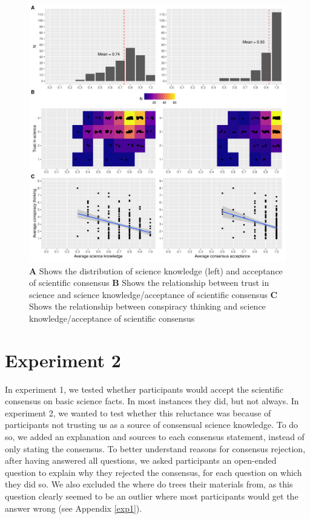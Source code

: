 \documentclass[
  doc,floatsintext]{apa6}
\begin{document}
\begin{figure}
\centering
\includegraphics{output/figures/exp1-plot-overview.pdf}
\caption{\label{fig:exp1-plot-overview}\textbf{A} Shows the distribution of science knowledge (left) and acceptance of scientific consensus \textbf{B} Shows the relationship between trust in science and science knowledge/acceptance of scientific consensus \textbf{C} Shows the relationship between conspiracy thinking and science knowledge/acceptance of scientific consensus}
\end{figure}

\clearpage

\section{Experiment 2}\label{exp2}

In experiment 1, we tested whether participants would accept the scientific consensus on basic science facts. In most instances they did, but not always. In experiment 2, we wanted to test whether this reluctance was because of participants not trusting us as a source of consensual science knowledge. To do so, we added an explanation and sources to each consensus statement, instead of only stating the consensus. To better understand reasons for consensus rejection, after having answered all questions, we asked participants an open-ended question to explain why they rejected the consensus, for each question on which they did so. We also excluded the where do trees their materials from, as this question clearly seemed to be an outlier where most participants would get the answer wrong (see Appendix \ref{exp1}).
\end{document}
